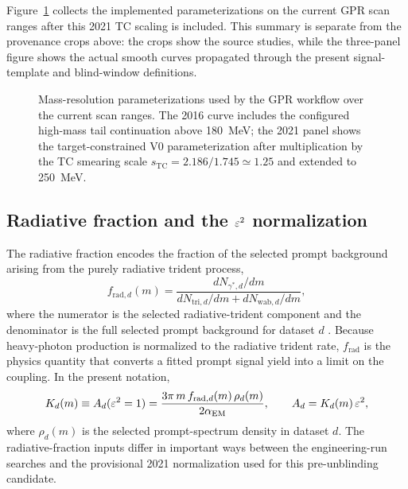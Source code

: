 Figure~\ref{fig:mass-resolution-three-panel} collects the implemented
parameterizations on the current GPR scan ranges after this 2021 TC scaling is
included. This summary is separate from the provenance crops above: the crops show the
source studies, while the three-panel figure shows the actual smooth curves propagated
through the present signal-template and blind-window definitions.

\begin{figure}[H]
\centering
{}
\caption{Mass-resolution parameterizations used by the GPR workflow over the current
scan ranges. The 2016 curve includes the configured high-mass tail continuation above
\SI{180}{MeV}; the 2021 panel shows the target-constrained V0 parameterization after
multiplication by the TC smearing scale $s_{\mathrm{TC}}=2.186/1.745\simeq1.25$ and
extended to \SI{250}{MeV}.}
\label{fig:mass-resolution-three-panel}
\end{figure}

\subsection{Radiative fraction and the \texorpdfstring{$\varepsilon^2$}{epsilon2} normalization}
\label{sec:radfrac}

The radiative fraction encodes the fraction of the selected prompt background arising
from the purely radiative trident process,
\begin{equation}
f_{\mathrm{rad},d}(m)
=
\frac{dN_{\gamma^\ast,d}/dm}{dN_{\mathrm{tri},d}/dm + dN_{\mathrm{wab},d}/dm},
\label{eq:frad-def}
\end{equation}
where the numerator is the selected radiative-trident component and the denominator is
the full selected prompt background for dataset $d$
\cite{HPS2015DarkPhoton,HPS2016PromptLong}. Because heavy-photon production is
normalized to the radiative trident rate, $f_{\mathrm{rad}}$ is the physics quantity
that converts a fitted prompt signal yield into a limit on the coupling. In the
present notation,
\begin{equation}
K_d(m) \equiv A_d(\varepsilon^2 = 1)
= \frac{3\pi\,m\,f_{\mathrm{rad},d}(m)\,\rho_d(m)}{2\alpha_{\mathrm{EM}}},
\qquad
A_d = K_d(m)\,\varepsilon^2,
\label{eq:kd-radfrac}
\end{equation}
where $\rho_d(m)$ is the selected prompt-spectrum density in dataset $d$. The
radiative-fraction inputs differ in important ways between the engineering-run searches
and the provisional 2021 normalization used for this pre-unblinding candidate.

